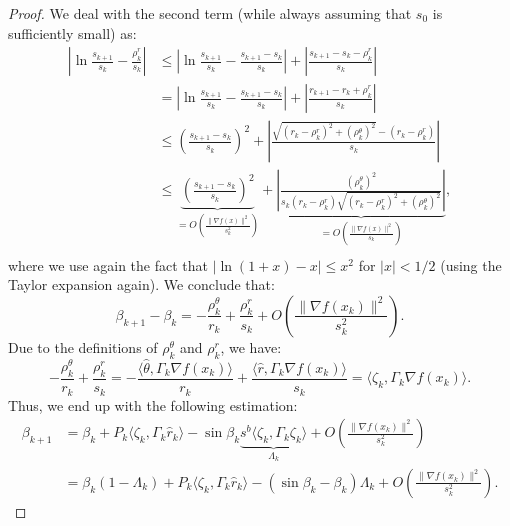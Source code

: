 \documentclass{article}
\theoremstyle{plain}
\theoremstyle{definition}
\theoremstyle{remark}
\newcommand{\innp}[2]{\langle #1, #2 \rangle}
\begin{document}
\begin{proof}
    We deal with the second term (while always assuming that $s_0$ is sufficiently small) as:
    \begin{equation*}
        \begin{aligned}
            \left|\ln \frac{s_{k + 1}}{s_k} - \frac{\rho_k^r}{s_k} \right|&\leq \left|\ln \frac{s_{k + 1}}{s_k} - \frac{s_{k + 1} - s_k}{s_k} \right| + \left|\frac{s_{k + 1} - s_k - \rho^r_k}{s_k}\right|\\
            &= \left|\ln \frac{s_{k + 1}}{s_k} - \frac{s_{k + 1} - s_k}{s_k} \right| + \left|\frac{r_{k + 1} - r_k + \rho^r_k}{s_k}\right|\\
            &\leq \left(\frac{s_{k + 1} - s_k}{s_k}\right)^2 + \left|\frac{\sqrt{(r_k - \rho_k^r)^2 + (\rho_k^\theta)^2} - (r_k - \rho^r_k)}{s_k}\right|\\
            &\leq \underbrace{\left(\frac{s_{k + 1} - s_k}{s_k}\right)^2}_{=O\left(\frac{\|\nabla f(x)\|^2}{s_k^2}\right)} + \underbrace{\left|\frac{(\rho_k^\theta)^2}{s_k(r_k - \rho^r_k)\sqrt{(r_k - \rho_k^r)^2 + (\rho_k^\theta)^2}}\right|}_{=O\left(\frac{\|\nabla f(x)\|^2}{s_k}\right)},\\
        \end{aligned}
    \end{equation*}
    where we use again the fact that $|\ln(1 + x) - x| \leq x^2$ for $|x| < 1/2$ (using the Taylor expansion again). We conclude that:
    \begin{equation*}
        \beta_{k + 1} - \beta_k = -\frac{\rho_k^\theta}{r_k} + \frac{\rho_k^r}{s_k} + O\left(\frac{\|\nabla f(x_k)\|^2}{s_k^2}\right).
    \end{equation*}
    Due to the definitions of $\rho_k^\theta$ and $\rho_k^r$, we have:
    \begin{equation*}
        -\frac{\rho_k^\theta}{r_k} + \frac{\rho_k^r}{s_k} = -\frac{\innp{\hat{\theta}}{\Gamma_k\nabla f(x_k)}}{r_k} + \frac{\innp{\hat{r}}{\Gamma_k\nabla f(x_k)}}{s_k} = \innp{\zeta_k}{\Gamma_k\nabla f(x_k)}.
    \end{equation*}
    Thus, we end up with the following estimation:
    \begin{equation*}
        \begin{aligned}
            \beta_{k + 1} &= \beta_k + P_k\innp{\zeta_k}{\Gamma_k\hat{r}_k} - \sin \beta_k \underbrace{s^b\innp{\zeta_k}{\Gamma_k\zeta_k}}_{\Lambda_k} + O\left(\frac{\|\nabla f(x_k)\|^2}{s_k^2}\right)\\
            &=\beta_k (1 - \Lambda_k) + P_k\innp{\zeta_k}{\Gamma_k\hat{r}_k} - (\sin \beta_k - \beta_k)\Lambda_k + O\left(\frac{\|\nabla f(x_k)\|^2}{s_k^2}\right).

\end{aligned}
\end{equation*}
\end{proof}
\end{document}
